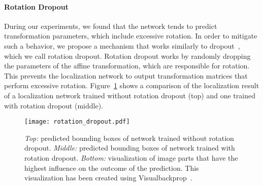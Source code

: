 \documentclass[letterpaper]{article}
\begin{document}
	\paragraph{Rotation Dropout}
		During our experiments, we found that the network tends to predict transformation parameters, which include excessive rotation.
		In order to mitigate such a behavior, we propose a mechanism that works similarly to dropout~\cite{Srivastava2014Dropout}, which we call rotation dropout.
		Rotation dropout works by randomly dropping the parameters of the affine transformation, which are responsible for rotation.
		This prevents the localization network to output transformation matrices that perform excessive rotation.
		Figure~\ref{fig:rotation_dropout_visualization} shows a comparison of the localization result of a localization network trained without rotation dropout (top) and one trained with rotation dropout (middle).

	\begin{figure}[t]
		\centering
		\texttt{[image: rotation\_dropout.pdf]}
		\caption{\emph{Top:} predicted bounding boxes of network trained without rotation dropout. \emph{Middle:} predicted bounding boxes of network trained with rotation dropout. \emph{Bottom:} visualization of image parts that have the highest influence on the outcome of the prediction. This visualization has been created using Visualbackprop~\cite{Bojarski2016Visualbackprop}.}
		\label{fig:rotation_dropout_visualization}
	\end{figure}
\end{document}
